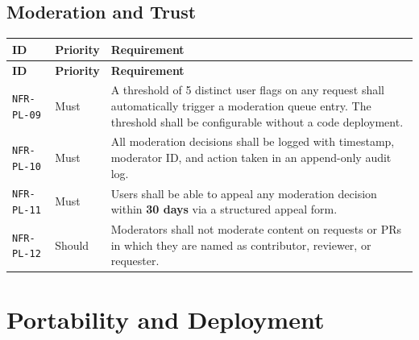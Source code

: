 \documentclass[12pt,a4paper]{article}
\begin{document}
\subsection{Moderation and Trust}
\begin{longtable}{L{2.2cm} L{1.8cm} L{9.3cm}}
  \color{white}\bfseries ID & \color{white}\bfseries Priority & \color{white}\bfseries Requirement \\
  \endfirsthead
  \color{white}\bfseries ID & \color{white}\bfseries Priority & \color{white}\bfseries Requirement \\
  \endhead\hline
  \texttt{NFR-PL-09} & Must   & A threshold of 5 distinct user flags on any request shall automatically trigger a moderation queue entry. The threshold shall be configurable without a code deployment. \\
  \texttt{NFR-PL-10} & Must   & All moderation decisions shall be logged with timestamp, moderator ID, and action taken in an append-only audit log. \\
  \texttt{NFR-PL-11} & Must   & Users shall be able to appeal any moderation decision within \textbf{30 days} via a structured appeal form. \\
  \texttt{NFR-PL-12} & Should & Moderators shall not moderate content on requests or PRs in which they are named as contributor, reviewer, or requester. \\
  \hline
\end{longtable}

\section{Portability and Deployment}
\end{document}
